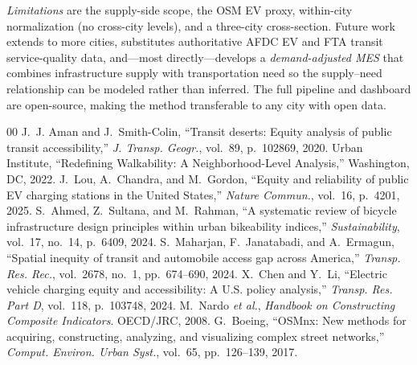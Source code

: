 \documentclass[conference]{IEEEtran}
\begin{document}
\emph{Limitations} are the supply-side scope, the OSM EV proxy, within-city
normalization (no cross-city levels), and a three-city cross-section. Future
work extends to more cities, substitutes authoritative AFDC EV and FTA transit
service-quality data, and---most directly---develops a \emph{demand-adjusted MES}
that combines infrastructure supply with transportation need so the supply--need
relationship can be modeled rather than inferred. The full pipeline and dashboard
are open-source, making the method transferable to any city with open data.

\balance
\begin{thebibliography}{00}
 J.~J. Aman and J.~Smith-Colin, ``Transit deserts: Equity analysis of public transit accessibility,'' \emph{J. Transp. Geogr.}, vol.~89, p.~102869, 2020.
 Urban Institute, ``Redefining Walkability: A Neighborhood-Level Analysis,'' Washington, DC, 2022.
 J.~Lou, A.~Chandra, and M.~Gordon, ``Equity and reliability of public EV charging stations in the United States,'' \emph{Nature Commun.}, vol.~16, p.~4201, 2025.
 S.~Ahmed, Z.~Sultana, and M.~Rahman, ``A systematic review of bicycle infrastructure design principles within urban bikeability indices,'' \emph{Sustainability}, vol.~17, no.~14, p.~6409, 2024.
 S.~Maharjan, F.~Janatabadi, and A.~Ermagun, ``Spatial inequity of transit and automobile access gap across America,'' \emph{Transp. Res. Rec.}, vol.~2678, no.~1, pp.~674--690, 2024.
 X.~Chen and Y.~Li, ``Electric vehicle charging equity and accessibility: A U.S. policy analysis,'' \emph{Transp. Res. Part D}, vol.~118, p.~103748, 2024.
 M.~Nardo \emph{et al.}, \emph{Handbook on Constructing Composite Indicators}. OECD/JRC, 2008.
 G.~Boeing, ``OSMnx: New methods for acquiring, constructing, analyzing, and visualizing complex street networks,'' \emph{Comput. Environ. Urban Syst.}, vol.~65, pp.~126--139, 2017.
\end{thebibliography}
\end{document}
